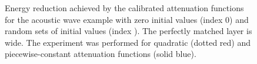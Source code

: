 \documentclass[a4paper]{article}
\begin{document}
\begin{figure}
   \caption{Energy reduction achieved by the calibrated attenuation
    functions for the acoustic wave example with zero initial values
    (index 0) and random sets of initial values (index ). The
    perfectly matched layer is  wide. The experiment was
    performed for quadratic (dotted red) and piecewise-constant
    attenuation functions (solid blue).}
  \label{fig:ac_rands}
\end{figure}
\end{document}
